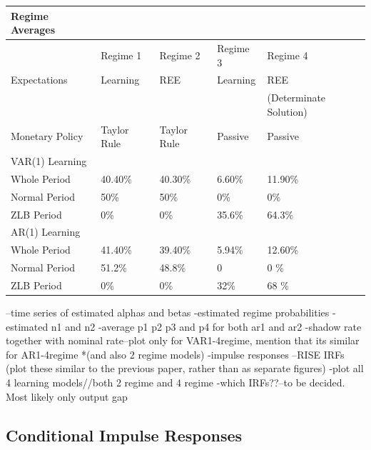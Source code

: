 \documentclass[12pt]{article}
\numberwithin{equation}{section}
\begin{document}
\begin{table}[hbt!]
\begin{tabular}{l|l|l|l|l}
Regime Averages &  &  &  \\
\hline
 & Regime 1 & Regime 2 & Regime 3 & Regime 4 \\
Expectations & Learning & REE & Learning & REE \\
 &  &  &  & (Determinate Solution) \\
Monetary Policy & Taylor Rule & Taylor Rule & Passive & Passive \\
\hline
\hline
VAR(1) Learning&  &  &  &  \\
\hline
 Whole Period & 40.40\% & 40.30\% & 6.60\% & 11.90\% \\
 Normal Period & 50\% & 50\% & 0\% & 0\% \\
ZLB Period & 0\% & 0\% & 35.6\% & 64.3\% \\
\hline
\hline
AR(1) Learning&  &  &  &  \\
\hline
Whole Period & 41.40\% & 39.40\% & 5.94\% & 12.60\% \\
Normal Period & 51.2\% & 48.8\% & 0 & 0 \% \\
ZLB Period & 0\% & 0\% & 32\% & 68 \% \\ 
\end{tabular}
\end{table}

--time series of estimated alphas and betas
-estimated regime probabilities
-estimated n1 and n2 
-average p1 p2 p3 and p4 for both ar1 and ar2
-shadow rate together with nominal rate--plot only for VAR1-4regime, mention that its similar for AR1-4regime *(and also 2 regime models)
-impulse responses
--RISE IRFs (plot these similar to the previous paper, rather than as separate figures)
-plot all 4 learning models//both 2 regime and 4 regime 
-which IRFs??--to be decided. Most likely only output gap

\FloatBarrier

\subsection{Conditional Impulse Responses}
\end{document}
